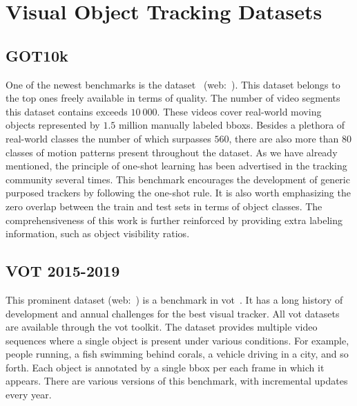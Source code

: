 \section{Visual Object Tracking Datasets}

\subsection{GOT10k}
\label{ssec:GOT10kDataset}

One of the newest benchmarks is the \gottenk{} dataset~\cite{huang2021got10k} (web:~\cite{webgot10kdataset}). This dataset belongs to the top ones freely available in terms of quality. The number of video segments this dataset contains exceeds $10\ 000$. These videos cover real-world moving objects represented by $1.5$ million manually labeled \glspl{bbox}. Besides a plethora of real-world classes the number of which surpasses $560$, there are also more than $80$ classes of motion patterns present throughout the dataset.
As we have already mentioned, the principle of one-shot learning has been advertised in the tracking community several times. This benchmark encourages the development of generic purposed trackers by following the one-shot rule. It is also worth emphasizing the zero overlap between the train and test sets in terms of object classes. The comprehensiveness of this work is further reinforced by providing extra labeling information, such as object visibility ratios.

\subsection{VOT 2015-2019}
\label{ssec:VOTDataset}

This prominent dataset (web:~\cite{webvot2019dataset}) is a benchmark in \gls{vot}~\cite{kristan2019motyolovot19}. It has a long history of development and annual challenges for the best visual tracker. All \gls{vot} datasets are available through the \gls{vot} toolkit. The dataset provides multiple video sequences where a single object is present under various conditions. For example, people running, a fish swimming behind corals, a vehicle driving in a city, and so forth. Each object is annotated by a single \gls{bbox} per each frame in which it appears. There are various versions of this benchmark, with incremental updates every year.

